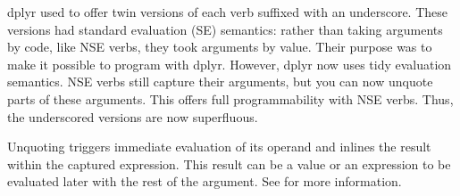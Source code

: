 \documentclass[a4paper]{book}
\begin{document}
%
\begin{Description}
\strong{[Deprecated]}

dplyr used to offer twin versions of each verb suffixed with an
underscore. These versions had standard evaluation (SE) semantics:
rather than taking arguments by code, like NSE verbs, they took
arguments by value. Their purpose was to make it possible to
program with dplyr. However, dplyr now uses tidy evaluation
semantics. NSE verbs still capture their arguments, but you can now
unquote parts of these arguments. This offers full programmability
with NSE verbs. Thus, the underscored versions are now superfluous.

Unquoting triggers immediate evaluation of its operand and inlines
the result within the captured expression. This result can be a
value or an expression to be evaluated later with the rest of the
argument. See  for more information.
\end{Description}
%
\end{document}
